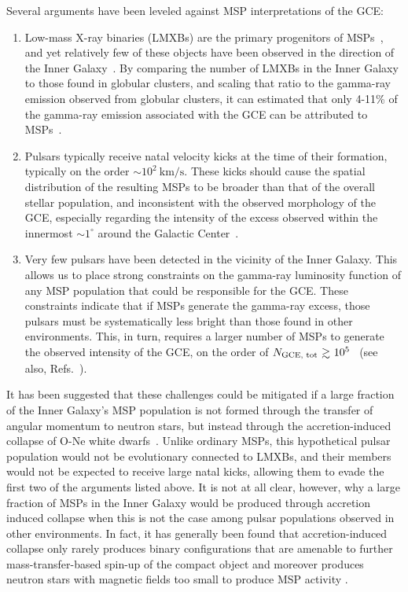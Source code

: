 \documentclass[a4paper,11pt]{article}
\newcommand{\gsim}{\raisebox{-0.13cm}{~\shortstack{$>$ \\[-0.07cm]
      $\sim$}}~}
\begin{document}
Several arguments have been leveled against 
MSP interpretations of the GCE:
\begin{enumerate}
%
\item{Low-mass X-ray binaries (LMXBs) are the primary progenitors of MSPs~\cite{1982Natur.300..728A,2009Sci...324.1411A}, and yet relatively few of these objects have been observed in the direction of the Inner Galaxy~\cite{Cholis:2014lta}. By comparing the number of LMXBs in the Inner Galaxy to those found in globular clusters, and scaling that ratio to the gamma-ray emission observed from globular clusters, it can estimated that only 4-11\% of the gamma-ray emission associated with the GCE can be attributed to MSPs~\cite{Haggard:2017lyq}.}
%
\item{Pulsars typically receive natal velocity kicks at the time of their formation, typically on the order $\sim 10^2~\textrm{km/s}$. These kicks should cause the spatial distribution of the resulting MSPs to be broader than that of the overall stellar population, and inconsistent with the observed morphology of the GCE, especially regarding the intensity of the excess observed within the innermost $\sim 1^{\circ}$ around the Galactic Center~\cite{Boodram:2022lpn}.}
%
\item{Very few pulsars have been detected in the vicinity of the Inner Galaxy. This allows us to place strong constraints on the gamma-ray luminosity function of any MSP population that could be responsible for the GCE. These constraints indicate that if MSPs generate the gamma-ray excess, those pulsars must be systematically less bright than those found in other environments. This, in turn, requires a larger number of MSPs to generate the observed intensity of the GCE, on the order of $N_\textrm{GCE, tot} \gsim 10^5$~\cite{Holst:2024fvb} (see also, Refs.~\cite{Cholis:2014noa,Hooper:2016rap,Hooper:2015jlu,Bartels:2018xom,Ploeg:2017vai,Ploeg:2020jeh,Dinsmore:2021nip}).}
%
\end{enumerate}

It has been suggested that these challenges could be mitigated if a large fraction of the Inner Galaxy's MSP population is not formed through the transfer of angular momentum to neutron stars, but instead through the accretion-induced collapse of O-Ne white dwarfs~\cite{Gautam:2021wqn}. Unlike ordinary MSPs, this hypothetical pulsar population would not be evolutionary connected to LMXBs, and their members would not be expected to receive large natal kicks, allowing them to evade the first two of the arguments listed above. It is not at all clear, however, why a large fraction of MSPs in the Inner Galaxy would be produced through accretion induced collapse when this is not the case among pulsar populations observed in other environments. 
% 
In fact, it has generally
been found that accretion-induced collapse only rarely produces binary configurations that are amenable to further mass-transfer-based spin-up of the compact object \cite{Kalogera_1996,Willems_2004} and moreover produces neutron stars with magnetic fields too
small to produce MSP activity \cite{Wijers_1997,sutantyo2000formationbinarymillisecondpulsars}.
\end{document}
